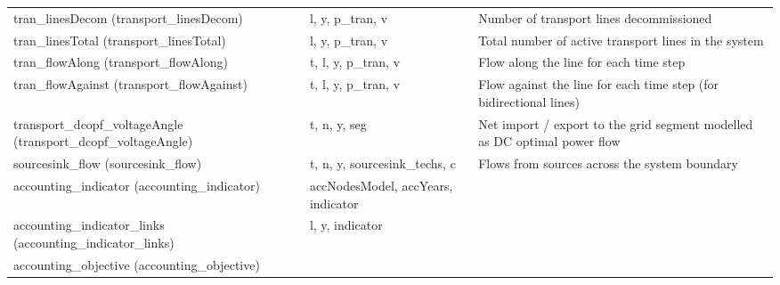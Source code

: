 \documentclass[11pt]{article}
\begin{document}
\begin{tabularx}{\textwidth}{| l | l | X |}
tran\_linesDecom (transport\_linesDecom)  & l, y, p\_tran, v & Number of transport lines decommissioned \\ 
tran\_linesTotal (transport\_linesTotal)  & l, y, p\_tran, v & Total number of active transport lines in the system \\ 
tran\_flowAlong (transport\_flowAlong)  & t, l, y, p\_tran, v & Flow along the line for each time step \\ 
tran\_flowAgainst (transport\_flowAgainst)  & t, l, y, p\_tran, v & Flow against the line for each time step (for bidirectional lines) \\ 
transport\_dcopf\_voltageAngle (transport\_dcopf\_voltageAngle)  & t, n, y, seg & Net import / export to the grid segment modelled as DC optimal power flow \\ 
sourcesink\_flow (sourcesink\_flow)  & t, n, y, sourcesink\_techs, c & Flows from sources across the system boundary \\ 
accounting\_indicator (accounting\_indicator)  & accNodesModel, accYears, indicator &  \\ 
accounting\_indicator\_links (accounting\_indicator\_links)  & l, y, indicator &  \\ 
accounting\_objective (accounting\_objective)  &  &  \\ 
\hline 
\end{tabularx}
\end{document}
